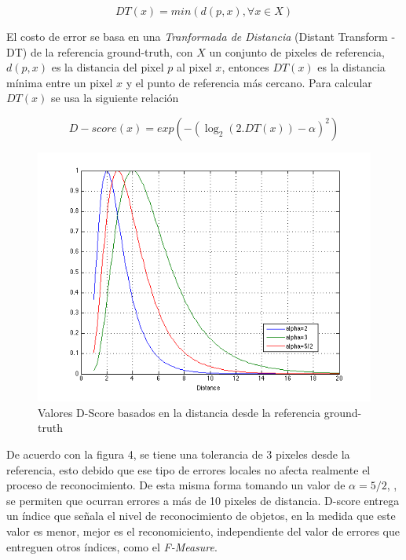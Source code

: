 \begin{equation}
DT(x) = min( d(p,x), \forall x \in X)
\end{equation}

El costo de error se basa en una \emph{Tranformada de Distancia} (Distant Transform - DT) de la referencia ground-truth, con $X$ un conjunto de pixeles de referencia, $d(p,x)$ es la distancia del pixel $p$ al pixel $x$, entonces $DT(x)$ es la distancia mínima entre un pixel $x$ y el punto de referencia más cercano. Para calcular $DT(x)$ se usa la siguiente relación

\begin{equation}
D-score(x) = exp( - (\log_2(2.DT(x)) - \alpha )^2)
\end{equation}


\begin{figure}[!ht]
\centering
\includegraphics[scale=0.4]{img/ch4/dscore}
\caption{Valores D-Score basados en la distancia desde la referencia ground-truth}
\label{fig:Valores D-Score}
\end{figure}

De acuerdo con la figura 4, se tiene una tolerancia de 3 pixeles desde la referencia, esto debido que ese tipo de errores locales no afecta realmente el proceso de reconocimiento. De esta misma forma tomando un valor de $\alpha=5/2$, \cite{park_benchmark_2013}, se permiten que ocurran errores a más de 10 pixeles de distancia. D-score entrega un índice que señala el nivel de reconocimiento de objetos, en la medida que este valor es menor, mejor es el reconomiciento, independiente del valor de errores que entreguen otros índices, como el \emph{F-Measure}.

